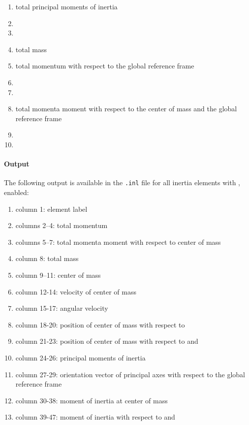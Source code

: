 \begin{enumerate}
\item {} total principal moments of inertia
\item {}
\item {}
\item {} total mass
\item {} total momentum with respect to the global reference frame
\item {}
\item {}
\item {} total momenta moment with respect to the center of mass and the global reference frame
\item {}
\item {}
\end{enumerate}

\paragraph{Output}
The following output is available in the \texttt{.inl} file for all inertia elements with ,  enabled:
\begin{enumerate}
\item column 1: element label
\item columns 2--4: total momentum
\item columns 5--7: total momenta moment with respect to center of mass
\item column 8: total mass
\item column 9--11: center of mass
\item column 12-14: velocity of center of mass
\item column 15-17: angular velocity
\item column 18-20: position of center of mass with respect to 
\item column 21-23: position of center of mass with respect to  and 
\item column 24-26: principal moments of inertia
\item column 27-29: orientation vector of principal axes with respect to the global reference frame
\item column 30-38: moment of inertia at center of mass
\item column 39-47: moment of inertia with respect to  and 
\end{enumerate}

